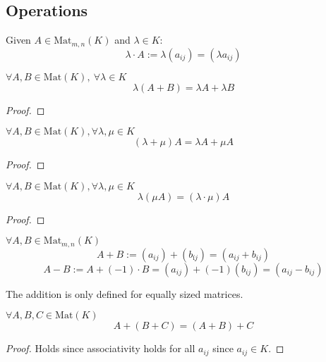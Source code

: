 \subsection{Operations}
\begin{definition}
   Given \(A \in \text{Mat}_{m,n}(K)\) and \(\lambda \in K\):
   \[\lambda \cdot A := \lambda (a_{ij}) = (\lambda a_{ij})\]
\end{definition}

\begin{proposition}[\(\lambda (A + B)\)]
   \(\forall A, B \in \text{Mat}(K),~\forall \lambda \in K\)
   \[\lambda (A + B) = \lambda A + \lambda B\]
\end{proposition}
\begin{proof}
\end{proof}

\begin{proposition}[\((\lambda + \mu) A\)]
   \(\forall A, B \in \text{Mat}(K), \forall \lambda, \mu \in K\)
   \[(\lambda + \mu) A = \lambda A + \mu A\]
\end{proposition}
\begin{proof}
\end{proof}

\begin{proposition}[\(\lambda (\mu A)\)]
   \(\forall A, B \in \text{Mat}(K), \forall \lambda, \mu \in K\)
   \[\lambda (\mu A) = (\lambda \cdot \mu) A\]
\end{proposition}
\begin{proof}
\end{proof}

\begin{definition}
   \(\forall A, B \in \text{Mat}_{m,n}(K)\)
   \[A + B := (a_{ij}) + (b_{íj}) = (a_{ij} + b_{ij})\]
   \[A - B := A + (-1) \cdot B = (a_{ij}) + (-1)(b_{ij}) = (a_{ij} - b_{ij})\]
\end{definition}
\begin{remark}
   The addition is only defined for equally sized matrices.
\end{remark}

\begin{proposition}
   \(\forall A, B, C \in \text{Mat}(K)\)
   \[A + (B + C) = (A + B) + C\]
\end{proposition}
\begin{proof}
   Holds since associativity holds for all \(a_{ij}\) since \(a_{ij} \in K\).
\end{proof}

